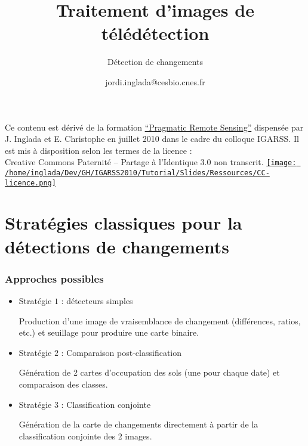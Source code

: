 \documentclass[compress]{beamer}
\title{Traitement d'images de télédétection}
\subtitle{Détection de changements}
\author
{jordi.inglada@cesbio.cnes.fr}
\institute[Cesbio] %
{\textsc{Centre d'Études Spatiales de la Biosphère, Toulouse, France}}
\date{}
\begin{document}
\begin{frame}
  \titlepage
  \begin{center}
{\tiny Ce contenu est dérivé de la formation \href{http://www.orfeo-toolbox.org/packages/PragmaticRemoteSensing-handout.pdf}{``Pragmatic Remote
  Sensing''} dispensée par J. Inglada et E. Christophe en juillet 2010
  dans le cadre du colloque IGARSS. Il est mis à disposition selon les termes de la licence :\\
Creative Commons Paternité – Partage à l’Identique 3.0 non transcrit.} \href{http://creativecommons.org/licenses/by-sa/3.0/}{\texttt{[image: /home/inglada/Dev/GH/IGARSS2010/Tutorial/Slides/Ressources/CC-licence.png]}}    
  \end{center}
\end{frame}


\section[Stratégies]{Stratégies classiques pour la détections de changements}

\begin{frame}
  \frametitle{Approches possibles}
\begin{itemize}

\item{Stratégie $1$ : détecteurs simples}

  Production d'une image de vraisemblance de changement (différences,
  ratios, etc.) et seuillage pour produire une carte binaire.

\item{Stratégie $2$ : Comparaison post-classification}

Génération de 2 cartes d'occupation des sols (une pour chaque date) et
comparaison des classes.

\item{Stratégie $3$ : Classification conjointe}

  Génération de la carte de changements directement à partir de la
  classification conjointe des 2 images.


\end{itemize}
\end{frame}
\end{document}
